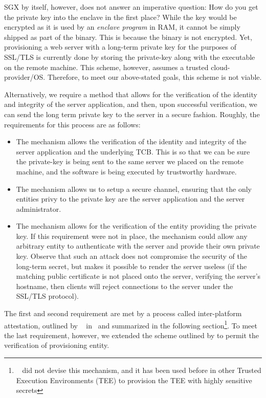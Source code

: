 \documentclass[../main.tex]{subfiles}
\begin{document}
SGX by itself, however, does not answer an imperative question: How do
you get the private key into the enclave in the first place? While the
key would be encrypted as it is used by an \textit{enclave program} in
RAM, it cannot be simply shipped as part of the binary. This is
because the binary is not encrypted. Yet, provisioning a web server
with a long-term private key for the purposes of SSL/TLS is currently
done by storing the private-key along with the executable on the
remote machine. This scheme, however, assumes a trusted
cloud-provider/OS. Therefore, to meet our above-stated goals,
this scheme is not viable.

Alternatively, we require a method that allows for the verification of
the identity and integrity of the server application, and then, upon
successful verification, we can send the long term private key to the
server in a secure fashion. Roughly, the requirements for this process
are as follows:
\begin{itemize}
  \item The mechanism allows the verification of the identity and
    integrity of the server application and the underlying TCB.  This is
    so that we can be sure the private-key is being sent to the same
    server we placed on the remote machine, and the software is being
    executed by trustworthy hardware.
  \item The mechanism allows us to setup a secure channel, ensuring that
    the only entities privy to the private key are the server
    application and the server administrator.
  \item The mechanism allows for the verification of the entity
    providing the private key. If this requirement were not in place,
    the mechanism could allow any arbitrary entity to authenticate with
    the server and provide their own private key. Observe that such an
    attack does not compromise the security of the long-term secret, but
    makes it possible to render the server useless (if the matching
    public certificate is not placed onto the server, verifying the
    server's hostname, then clients will reject connections to the
    server under the SSL/TLS protocol). %
\end{itemize}
The first and second requirement are met by a process called
inter-platform attestation, outlined by \Intel~
in~\cite{IntelCorporation2010} and summarized in the following
section\footnote{\Intel~ did not devise this mechanism, and it has
  been used before in other Trusted Execution Environments (TEE) to
  provision the TEE with highly sensitive secrets}. To meet the last
requirement, however, we extended the scheme outlined by \Intel to
permit the verification of provisioning entity.
\end{document}
